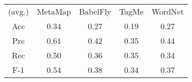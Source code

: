 \begin{tabular}{ccccc}
(avg.) & MetaMap & BabelFly & TagMe & WordNet\\ 
Acc & 0.34 & 0.27 & 0.19 & 0.27\\ 
Pre & 0.61 & 0.42 & 0.35 & 0.44\\ 
Rec & 0.50 & 0.36 & 0.35 & 0.34\\ 
F-1 & 0.54 & 0.38 & 0.34 & 0.37\\ 

\end{tabular}